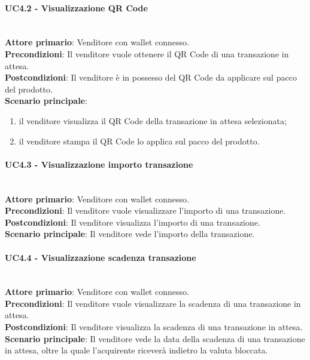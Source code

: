 \documentclass[a4paper, 12pt]{article}
\begin{document}
\paragraph{UC4.2 - Visualizzazione QR Code}\\
\textbf{Attore primario}: Venditore con wallet connesso.\\
\textbf{Precondizioni}: Il venditore vuole ottenere il QR Code di una transazione in attesa.\\
\textbf{Postcondizioni}: Il venditore è in possesso del QR Code da applicare sul pacco del prodotto.\\
\textbf{Scenario principale}:
\begin{enumerate}
\item il venditore visualizza il QR Code della transazione in attesa selezionata;
\item il venditore stampa il QR Code lo applica sul pacco del prodotto.
\end{enumerate}

\paragraph{UC4.3 - Visualizzazione importo transazione}\\
\textbf{Attore primario}: Venditore con wallet connesso.\\
\textbf{Precondizioni}: Il venditore vuole visualizzare l'importo di una transazione.\\
\textbf{Postcondizioni}: Il venditore visualizza l'importo di una transazione.\\
\textbf{Scenario principale}: Il venditore vede l'importo della transazione.\\

\paragraph{UC4.4 - Visualizzazione scadenza transazione}\\
\textbf{Attore primario}: Venditore  con wallet connesso.\\
\textbf{Precondizioni}: Il venditore vuole visualizzare la scadenza di una transazione in attesa.\\
\textbf{Postcondizioni}: Il venditore visualizza la scadenza di una transazione in attesa.\\
\textbf{Scenario principale}: Il venditore vede la data della scadenza di una transazione in attesa, oltre la quale l'acquirente riceverà indietro la valuta bloccata.\\
\end{document}
